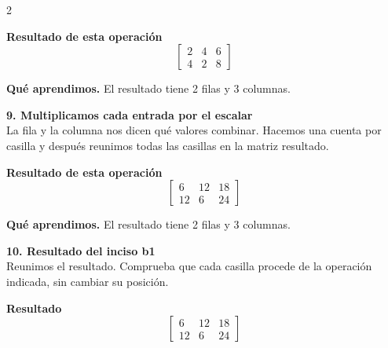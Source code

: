 \documentclass[11pt,a4paper,landscape]{article}
\begin{document}
\begin{multicols*}{2}
\begin{minipage}{\linewidth}
\par\smallskip \textbf{Resultado de esta operación}\[\begin{bmatrix}2 & 4 & 6\\4 & 2 & 8\end{bmatrix}\]
\par\smallskip\textbf{Qué aprendimos.} El resultado tiene 2 filas y 3 columnas.
\end{minipage}\par\medskip
\noindent\begin{minipage}{\linewidth}\textbf{9. Multiplicamos cada entrada por el escalar}\\[2pt]La fila y la columna nos dicen qué valores combinar. Hacemos una cuenta por casilla y después reunimos todas las casillas en la matriz resultado.
\par{}\par\smallskip
\par\smallskip \textbf{Resultado de esta operación}\[\begin{bmatrix}6 & 12 & 18\\12 & 6 & 24\end{bmatrix}\]
\par\smallskip\textbf{Qué aprendimos.} El resultado tiene 2 filas y 3 columnas.
\end{minipage}\par\medskip
\noindent\begin{minipage}{\linewidth}\textbf{10. Resultado del inciso b1}\\[2pt]Reunimos el resultado. Comprueba que cada casilla procede de la operación indicada, sin cambiar su posición.
\par\smallskip \textbf{Resultado}\[\begin{bmatrix}6 & 12 & 18\\12 & 6 & 24\end{bmatrix}\]

\end{minipage}
\end{multicols*}
\end{document}
